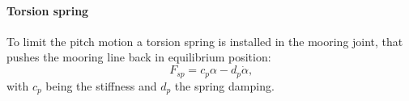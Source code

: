 \documentclass[oneside,10pt,a4paper]{book}
\begin{document}
\paragraph{Torsion spring}
To limit the pitch motion a torsion spring is installed in the mooring joint, that pushes the mooring line back in equilibrium position:
\begin{equation}
	F_{sp}=c_p\alpha-d_p\dot{\alpha}\text{,}\label{eq:torsionspring}
\end{equation}
with $c_p$ being the stiffness and $d_p$ the spring damping.
\end{document}
